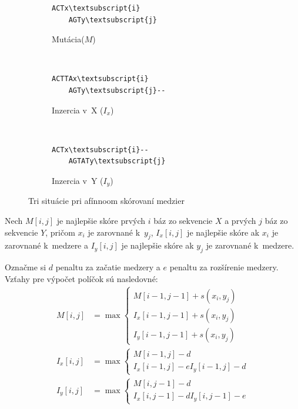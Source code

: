 \begin{figure}[htp]
    \centering
    \begin{subfigure}[m]{0.3\textwidth}
    \centering
    \begin{BVerbatim}[commandchars=\\\{\}]
    ACTx\textsubscript{i}
    AGTy\textsubscript{j}
    \end{BVerbatim}
    \caption{Mutácia($M$)}
    \end{subfigure}
    ~
    \begin{subfigure}[m]{0.3\textwidth}
    \centering
    \begin{BVerbatim}[commandchars=\\\{\}]
    ACTTAx\textsubscript{i}
    AGTy\textsubscript{j}--
    \end{BVerbatim}
    \caption{Inzercia v~X ($I_x$)}
    \end{subfigure}
    ~
    \begin{subfigure}[m]{0.3\textwidth}
    \centering
    \begin{BVerbatim}[commandchars=\\\{\}]
    ACTx\textsubscript{i}--
    AGTATy\textsubscript{j}
    \end{BVerbatim}
    \caption{Inzercia v~Y ($I_y$)}
    \end{subfigure}
    \caption[Situácie pri afínnoom skórovaní]{Tri situácie pri afínnoom skórovaní medzier}
    \label{fig:affine-space-situations}
\end{figure}

Nech $M[i,j]$ je najlepšie skóre prvých $i$ báz zo sekvencie $X$ a prvých $j$ báz zo sekvencie $Y$, pričom $x_i$ je zarovnané k~$y_j$, $I_x[i,j]$ je najlepšie skóre ak $x_i$ je zarovnané k~medzere a $I_y[i,j]$ je najlepšie skóre ak $y_j$ je zarovnané k~medzere.

Označme si $d$ penaltu za začatie medzery a $e$ penaltu za rozšírenie medzery. Vzťahy pre výpočet políčok sú nasledovné:
\begin{align*}
M[i,j] &= \max \left\{
\begin{array}{l}
M[i-1,j-1]+s(x_i, y_j)\\
I_x[i-1,j-1]+s(x_i, y_j)\\
I_y[i-1,j-1]+s(x_i, y_j)
\end{array} \right.\\
I_x[i,j] &= \max \left\{
\begin{array}{l}
M[i-1,j]-d\\
I_x[i-1,j]-e
I_y[i-1,j]-d
\end{array} \right.\\
I_y[i,j] &= \max \left\{
\begin{array}{l}
M[i,j-1]-d\\
I_x[i,j-1]-d
I_y[i,j-1]-e
\end{array} \right.
\end{align*}

